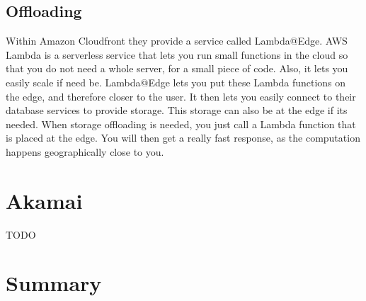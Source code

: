 \subsection{Offloading}
Within Amazon Cloudfront they provide a service called Lambda@Edge. AWS Lambda is a serverless service that lets you run small functions in the cloud so that you do not need a whole server, for a small piece of code. Also, it lets you easily scale if need be. Lambda@Edge lets you put these Lambda functions on the edge, and therefore closer to the user. It then lets you easily connect to their database services to provide storage. This storage can also be at the edge if its needed. When storage offloading is needed, you just call a Lambda function that is placed at the edge. You will then get a really fast response, as the computation happens geographically close to you.


\section{Akamai}
TODO


\section{Summary}
